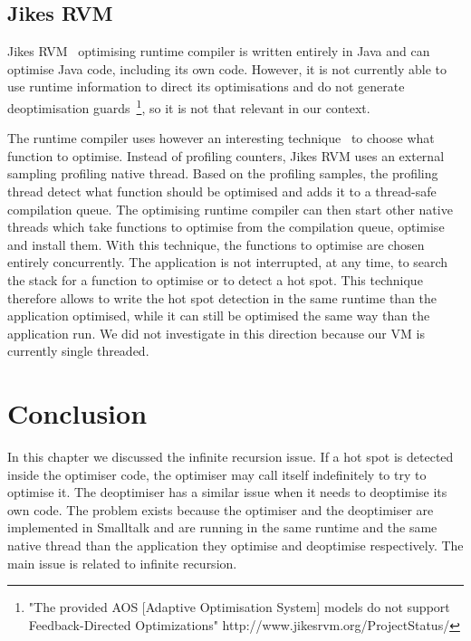 \documentclass[a4paper,12pt,twoside]{../includes/ThesisStyle}
\begin{document}
\subsection{Jikes RVM}

Jikes RVM~\cite{Alp99a,Arn00} optimising runtime compiler is written entirely in Java and can optimise Java code, including its own code. However, it is not currently able to use runtime information to direct its optimisations and do not generate deoptimisation guards~\footnote{"The provided AOS [Adaptive Optimisation System] models do not support Feedback-Directed Optimizations" http://www.jikesrvm.org/ProjectStatus/}, so it is not that relevant in our context. 

The runtime compiler uses however an interesting technique~\cite{Arn00} to choose what function to optimise. Instead of profiling counters, Jikes RVM uses an external sampling profiling native thread. Based on the profiling samples, the profiling thread detect what function should be optimised and adds it to a thread-safe compilation queue. The optimising runtime compiler can then start other native threads which take functions to optimise from the compilation queue, optimise and install them. With this technique, the functions to optimise are chosen entirely concurrently. The application is not interrupted, at any time, to search the stack for a function to optimise or to detect a hot spot. This technique therefore allows to write the hot spot detection in the same runtime than the application optimised, while it can still be optimised the same way than the application run. We did not investigate in this direction because our VM is currently single threaded.


\section*{Conclusion}

In this chapter we discussed the infinite recursion issue. If a hot spot is detected inside the optimiser code, the optimiser may call itself indefinitely to try to optimise it. The deoptimiser has a similar issue when it needs to deoptimise its own code. The problem exists because the optimiser and the deoptimiser are implemented in Smalltalk and are running in the same runtime and the same native thread than the application they optimise and deoptimise respectively. The main issue is related to infinite recursion.
\end{document}
